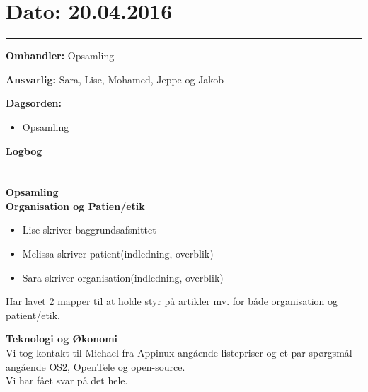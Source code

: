 \section{Dato: 20.04.2016}
\hrule

\textbf{Omhandler:} Opsamling

\textbf{Ansvarlig:} Sara, Lise, Mohamed, Jeppe og Jakob

\textbf{Dagsorden:}
\begin{itemize}
	\item Opsamling
\end{itemize}

\textbf{Logbog}
\\
\\ \\

\textbf{Opsamling}
\\
\textbf{Organisation og Patien/etik}
\\
\begin{itemize}
	\item Lise skriver baggrundsafsnittet
	\item Melissa skriver patient(indledning, overblik)
	\item Sara skriver organisation(indledning, overblik)
\end{itemize}
Har lavet 2 mapper til at holde styr på artikler mv. for både organisation og patient/etik.

\textbf{Teknologi og Økonomi}
\\
Vi tog kontakt til Michael fra Appinux angående listepriser og et par spørgsmål angående OS2, OpenTele og open-source.\\
Vi har fået svar på det hele. 
